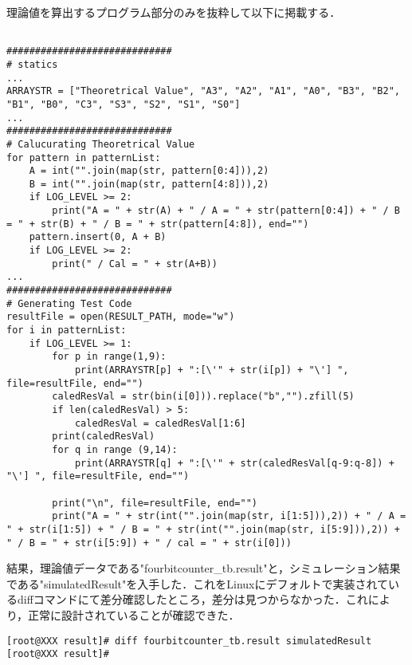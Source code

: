 \documentclass[11pt,a4j]{jarticle}
\begin{document}
                理論値を算出するプログラム部分のみを抜粋して以下に掲載する．

                \begin{lstlisting}[caption=hoge,label=fuga]

#############################
# statics
...
ARRAYSTR = ["Theoretrical Value", "A3", "A2", "A1", "A0", "B3", "B2", "B1", "B0", "C3", "S3", "S2", "S1", "S0"]
...
#############################
# Calucurating Theoretrical Value
for pattern in patternList:
    A = int("".join(map(str, pattern[0:4])),2)
    B = int("".join(map(str, pattern[4:8])),2)
    if LOG_LEVEL >= 2:
        print("A = " + str(A) + " / A = " + str(pattern[0:4]) + " / B = " + str(B) + " / B = " + str(pattern[4:8]), end="")
    pattern.insert(0, A + B)
    if LOG_LEVEL >= 2:
        print(" / Cal = " + str(A+B))
...
#############################
# Generating Test Code
resultFile = open(RESULT_PATH, mode="w")
for i in patternList:
    if LOG_LEVEL >= 1:
        for p in range(1,9):
            print(ARRAYSTR[p] + ":[\'" + str(i[p]) + "\'] ", file=resultFile, end="")
        caledResVal = str(bin(i[0])).replace("b","").zfill(5)
        if len(caledResVal) > 5:
            caledResVal = caledResVal[1:6]
        print(caledResVal)
        for q in range (9,14):
            print(ARRAYSTR[q] + ":[\'" + str(caledResVal[q-9:q-8]) + "\'] ", file=resultFile, end="")

        print("\n", file=resultFile, end="")
        print("A = " + str(int("".join(map(str, i[1:5])),2)) + " / A = " + str(i[1:5]) + " / B = " + str(int("".join(map(str, i[5:9])),2)) + " / B = " + str(i[5:9]) + " / cal = " + str(i[0]))

                \end{lstlisting}

                結果，理論値データである"fourbitcounter\_tb.result"と，シミュレーション結果である"simulatedResult"を入手した．これをLinuxにデフォルトで実装されているdiffコマンドにて差分確認したところ，差分は見つからなかった．これにより，正常に設計されていることが確認できた．

                \begin{lstlisting}[caption=diffコマンドの実行結果,label=fuga]
[root@XXX result]# diff fourbitcounter_tb.result simulatedResult 
[root@XXX result]# 
                \end{lstlisting}
\end{document}
